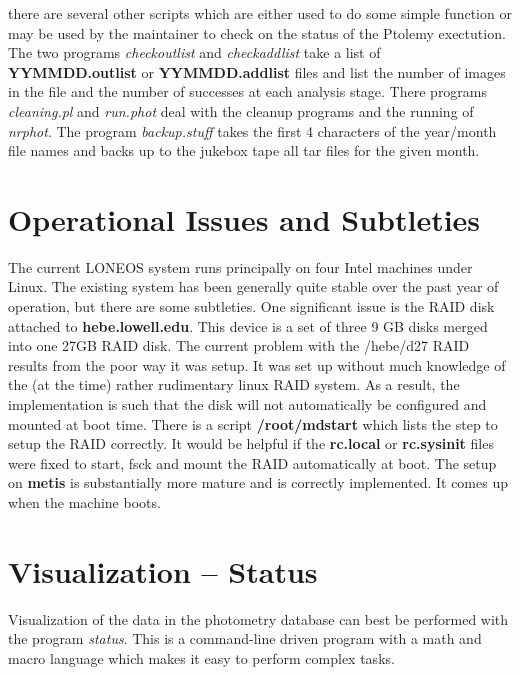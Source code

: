 \documentclass{article}
\newcommand\pr{\em}                   %
\newcommand\ff{\bf}                   %
\begin{document}
there are several other scripts which are either used to do some
simple function or may be used by the maintainer to check on the
status of the Ptolemy exectution.  The two programs {\pr checkoutlist}
and {\pr checkaddlist} take a list of {\ff YYMMDD.outlist} or {\ff
YYMMDD.addlist} files and list the number of images in the file and
the number of successes at each analysis stage.  There programs {\pr
cleaning.pl} and {\pr run.phot} deal with the cleanup programs and the
running of {\pr nrphot}.  The program {\pr backup.stuff} takes the
first 4 characters of the year/month file names and backs up to the
jukebox tape all tar files for the given month.

\section{Operational Issues and Subtleties}

The current LONEOS system runs principally on four Intel machines
under Linux.  The existing system has been generally quite stable over
the past year of operation, but there are some subtleties.  One
significant issue is the RAID disk attached to {\ff hebe.lowell.edu}.
This device is a set of three 9 GB disks merged into one 27GB RAID
disk.  The current problem with the /hebe/d27 RAID results from the
poor way it was setup.  It was set up without much knowledge of the
(at the time) rather rudimentary linux RAID system.  As a result, the
implementation is such that the disk will not automatically be
configured and mounted at boot time.  There is a script {\ff
/root/mdstart} which lists the step to setup the RAID correctly.  It
would be helpful if the {\ff rc.local} or {\ff rc.sysinit} files were
fixed to start, fsck and mount the RAID automatically at boot.  The
setup on {\ff metis} is substantially more mature and is correctly
implemented.  It comes up when the machine boots.

\section{Visualization -- Status}

Visualization of the data in the photometry database can best be
performed with the program {\pr status}.  This is a command-line
driven program with a math and macro language which makes it easy to
perform complex tasks.  
\end{document}
